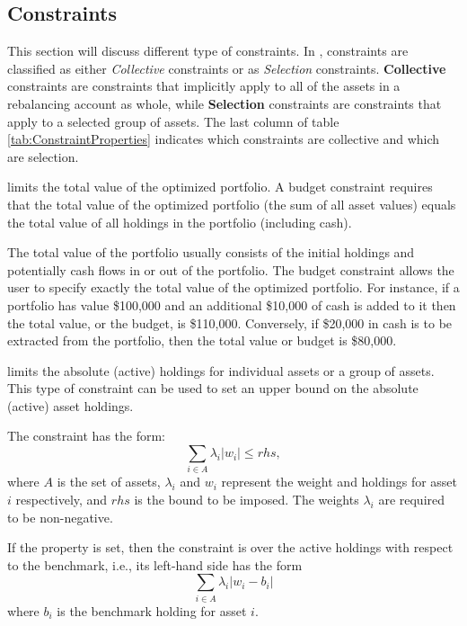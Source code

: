 \subsection{Constraints}

This section will discuss different type of constraints.
In \axioma, constraints are classified as either 
\emph{Collective} constraints or as \emph{Selection} constraints. 
\textbf{Collective} constraints are constraints that implicitly apply to all of the assets in a rebalancing account as whole, 
while \textbf{Selection} constraints are constraints that apply to a selected group of assets. 
The last column of table \ref{tab:ConstraintProperties} indicates which constraints are collective and which are selection.

   limits the total value of the optimized portfolio.
   A budget constraint requires that the total value of the optimized portfolio (the sum of all asset values) 
   equals the total value of all holdings in the portfolio (including cash). 

	The total value of the portfolio usually consists of the initial holdings 
   and potentially cash flows in or out of the portfolio. 
   The budget constraint allows the user to specify exactly the total value of the optimized portfolio. 
   For instance, if	a portfolio has value \$100,000 and an additional \$10,000 of cash is added to it then the total value,
   or the budget, is \$110,000. 
   Conversely, if \$20,000 in cash is to be extracted from the portfolio, then the total value or budget is \$80,000.

   limits the absolute (active) holdings for individual assets or a group of assets. 
   This type of constraint can be used to set an upper bound on the absolute (active) asset holdings. 

   The constraint has the form: 
   \[
       \sum_{i\in A} \lambda_i |w_i| \le rhs,
   \]
   where $A$ is the set of assets, $\lambda_i$ and $w_i$ represent the weight and holdings for asset $i$ respectively, 
   and $rhs$ is the bound to be imposed. 
   The weights $\lambda_i$ are required to be non-negative. 
 
   If the  property is set, 
   then the constraint is over the active holdings with respect to the benchmark, 
   i.e., its left-hand side has the form 
   \[
       \sum_{i\in A} \lambda_i |w_i-b_i|
   \]
   where $b_i$ is the benchmark holding for asset $i$. 
   
